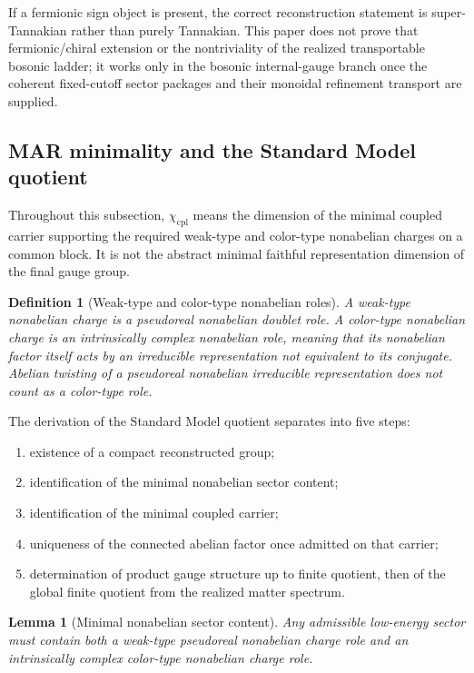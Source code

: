 \documentclass[11pt]{article}
\newtheorem{lemma}[theorem]{Lemma}
\newtheorem{definition}[theorem]{Definition}
\begin{document}
If a fermionic sign object is present, the correct reconstruction statement is super-Tannakian rather than purely Tannakian. This paper does not prove that fermionic/chiral extension or the nontriviality of the realized transportable bosonic ladder; it works only in the bosonic internal-gauge branch once the coherent fixed-cutoff sector packages and their monoidal refinement transport are supplied.

\subsection{MAR minimality and the Standard Model quotient}

Throughout this subsection, $\chi_{\mathrm{cpl}}$ means the dimension of the minimal coupled carrier supporting the required weak-type and color-type nonabelian charges on a common block. It is not the abstract minimal faithful representation dimension of the final gauge group.

\begin{definition}[Weak-type and color-type nonabelian roles]
A weak-type nonabelian charge is a pseudoreal nonabelian doublet role. A color-type nonabelian charge is an intrinsically complex nonabelian role, meaning that its nonabelian factor itself acts by an irreducible representation not equivalent to its conjugate. Abelian twisting of a pseudoreal nonabelian irreducible representation does not count as a color-type role.
\end{definition}

The derivation of the Standard Model quotient separates into five steps:
\begin{enumerate}[leftmargin=2em]
\item existence of a compact reconstructed group;
\item identification of the minimal nonabelian sector content;
\item identification of the minimal coupled carrier;
\item uniqueness of the connected abelian factor once admitted on that carrier;
\item determination of product gauge structure up to finite quotient, then of the global finite quotient from the realized matter spectrum.
\end{enumerate}

\begin{lemma}[Minimal nonabelian sector content]\label{lem:mincontent}
Any admissible low-energy sector must contain both a weak-type pseudoreal nonabelian charge role and an intrinsically complex color-type nonabelian charge role.
\end{lemma}
\end{document}

